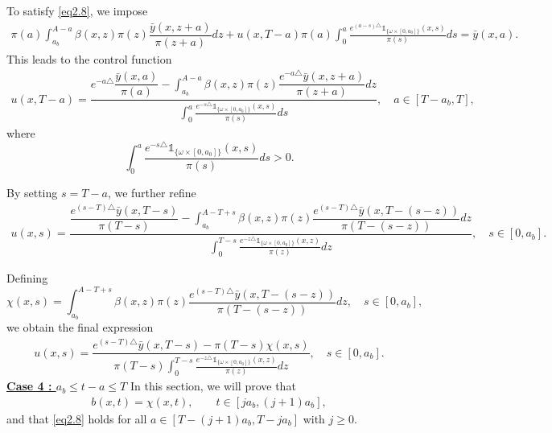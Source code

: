 \documentclass[10pt, a4]{amsart}
\makeatletter
\theoremstyle{plain}
\theoremstyle{definition}
\theoremstyle{remark}
\renewenvironment{proof}[1][\proofname]{\par
  \pushQED{\qed}%
  \normalfont \topsep6\p@\@plus6\p@\relax
  \trivlist
  \item[\hskip\labelsep
        \itshape
    #1\ \ref{#1}.]\ignorespaces
}{%
  \popQED\endtrivlist\@endpefalse
}
\numberwithin{equation}{section}
\makeatother
\begin{document}
\begin{proof}[of Proposition \ref{pr2.3}]
To satisfy \eqref{eq2.8}, we impose  
\begin{align*}
 \pi(a) \int_{a_b}^{A-a} \beta(x,z)  \pi(z) \dfrac{\bar{y}(x,z+a)}{\pi(z+a)} dz + u(x,T-a) \pi(a) \int_{0}^{a} \frac{e^{(a-s)\triangle} \mathds{1}_{\lbrace\omega\times[0,a_0]\rbrace}(x,s)}{\pi(s)} ds = \bar{y}(x,a).
\end{align*}  
This leads to the control function  
\begin{align}
    u(x,T-a) = \dfrac{e^{-a\triangle} \dfrac{\bar{y}(x,a)}{\pi(a)} - \displaystyle\int_{a_b}^{A-a} \beta(x,z)  \pi(z) \dfrac{e^{-a\triangle} \bar{y}(x,z+a)}{\pi(z+a)} dz}{\displaystyle\int_{0}^{a} \frac{e^{-s\triangle} \mathds{1}_{\lbrace\omega\times[0,a_0]\rbrace}(x,s)}{\pi(s)} ds}, \quad a\in [T-a_b,T],
\end{align}  
where  
\begin{equation*}
\int_{0}^{a} \frac{e^{-s\triangle} \mathds{1}_{\lbrace\omega\times[0,a_0]\rbrace}(x,s)}{\pi(s)} ds > 0.
\end{equation*}  

By setting \( s = T-a \), we further refine  
\begin{align*}
u(x,s) = \dfrac{\dfrac{e^{(s-T)\triangle} \bar{y}(x,T-s)}{\pi(T-s)} - \displaystyle\int_{a_b}^{A-T+s} \beta(x,z)  \pi(z) \dfrac{e^{(s-T)\triangle} \bar{y}(x,T-(s-z))}{\pi(T-(s-z))} dz}{\displaystyle\int_{0}^{T-s} \frac{e^{-z\triangle} \mathds{1}_{\lbrace\omega\times[0,a_0]\rbrace}(x,z)}{\pi(z)} dz}, \quad s\in[0,a_b].
\end{align*}  

Defining  
\begin{equation}
\chi(x,s) = \int_{a_b}^{A-T+s} \beta(x,z)  \pi(z) \dfrac{e^{(s-T)\triangle} \bar{y}(x,T-(s-z))}{\pi(T-(s-z))} dz, \quad s\in[0,a_b],
\end{equation}  
we obtain the final expression  
\begin{align}\label{eq2.17}
    u(x,s) = \dfrac{e^{(s-T)\triangle} \bar{y}(x,T-s) - \pi(T-s) \chi(x,s)}{\pi(T-s) \displaystyle\int_{0}^{T-s} \frac{e^{-z\triangle} \mathds{1}_{\lbrace\omega\times[0,a_0]\rbrace}(x,z)}{\pi(z)} dz}, \quad s\in[0,a_b].
\end{align}  
\underline{\bf{Case 4 : $a_b\leq t-a\leq T$}}  
In this section, we will prove that  
\begin{align}
b(x,t) =\chi (x,t), \qquad t\in [ja_b, (j+1)a_b],
\end{align}  
and that \eqref{eq2.8} holds for all \( a \in [T-(j+1)a_b, T-ja_b] \) with \( j \geq 0 \).  


\end{proof}
\end{document}
